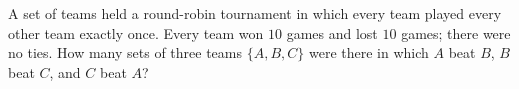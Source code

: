 A set of teams held a round-robin tournament in which every team played every other team exactly once. Every team won $10$ games and lost $10$ games; there were no ties. How many sets of three teams $\{A,B,C\}$ were there in which $A$ beat $B$, $B$ beat $C$, and $C$ beat $A$?
